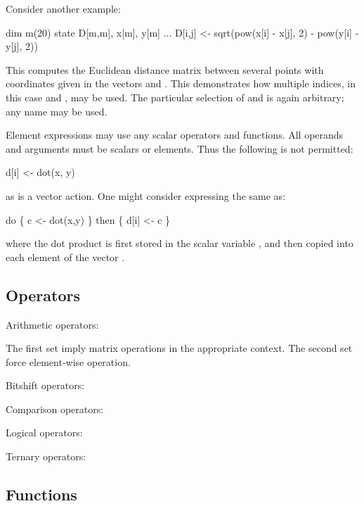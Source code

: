Consider another example:
\begin{bicode}
dim m(20)
state D[m,m], x[m], y[m]
\(\ldots\)
D[i,j] <- sqrt(pow(x[i] - x[j], 2) - pow(y[i] - y[j], 2))
\end{bicode}

This computes the Euclidean distance matrix  between several points
with coordinates given in the vectors  and . This
demonstrates how multiple indices, in this case  and , may
be used. The particular selection of  and  is again
arbitrary; any name may be used.

Element expressions may use any scalar operators and functions. All operands
and arguments must be scalars or elements. Thus the following is not
permitted:
\begin{bicode}
d[i] <- dot(x, y)
\end{bicode}
as  is a vector action. One might consider expressing the same
as:
\begin{bicode}
do \{
  c <- dot(x,y)
\} then \{
  d[i] <- c
\}
\end{bicode}
where the dot product is first stored in the scalar variable , and
then copied into each element of the vector .

\subsection{Operators\label{Operators}}

Arithmetic operators:

\bitt{+ - * / \% \^{}}


The first set imply matrix operations in the appropriate context. The second
set force element-wise operation.

Bitshift operators:

\bitt{<< >>}

Comparison operators:

\bitt{== != < <= > >= }

Logical operators:

\bitt{\&\& ||}

Ternary operators:


\subsection{Functions\label{Functions}}

